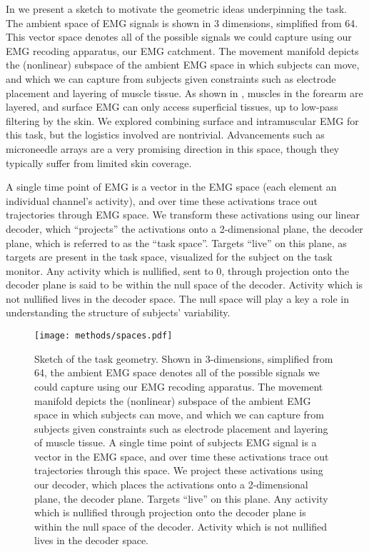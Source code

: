 \documentclass[../main.tex]{subfiles}
\begin{document}
In  we present a sketch to motivate the geometric ideas underpinning the task. The ambient space of EMG signals is shown in 3 dimensions, simplified from 64. This vector space denotes all of the possible signals we could capture using our EMG recoding apparatus, our EMG catchment. The movement manifold depicts the (nonlinear) subspace of the ambient EMG space in which subjects can move, and which we can capture from subjects given constraints such as electrode placement and layering of muscle tissue. As shown in , muscles in the forearm are layered, and surface EMG can only access superficial tissues, up to low-pass filtering by the skin. We explored combining surface and intramuscular EMG for this task, but the logistics involved are nontrivial. Advancements such as microneedle arrays are a very promising direction in this space, though they typically suffer from limited skin coverage\cite{jiSkinintegratedBiocompatibleStretchable2023,sattiMicroneedleArrayElectrodeBased2021,chungMyomatrixArraysHighdefinition}. 

A single time point of EMG is a vector in the EMG space (each element an individual channel's activity), and over time these activations trace out trajectories through EMG space. We transform these activations using our linear decoder, which ``projects'' the activations onto a 2-dimensional plane, the decoder plane, which is referred to as the ``task space''. Targets ``live'' on this plane, as targets are present in the task space, visualized for the subject on the task monitor. Any activity which is nullified, sent to 0, through projection onto the decoder plane is said to be within the null space of the decoder. Activity which is not nullified lives in the decoder space. The null space will play a key a role in understanding the structure of subjects' variability.

\begin{figure}[!htb]
  \centering
  \texttt{[image: methods/spaces.pdf]}
  \caption[Sketch of the task geometry]{Sketch of the task geometry. Shown in 3-dimensions, simplified from 64, the ambient EMG space denotes all of the possible signals we could capture using our EMG recoding apparatus. The movement manifold depicts the (nonlinear) subspace of the ambient EMG space in which subjects can move, and which we can capture from subjects given constraints such as electrode placement and layering of muscle tissue. A single time point of subjects EMG signal is a vector in the EMG space, and over time these activations trace out trajectories through this space. We project these activations using our decoder, which places the activations onto a 2-dimensional plane, the decoder plane. Targets ``live'' on this plane. Any activity which is nullified through projection onto the decoder plane is within the null space of the decoder. Activity which is not nullified lives in the decoder space.}\label{fig:spaces}
\end{figure}
\end{document}
